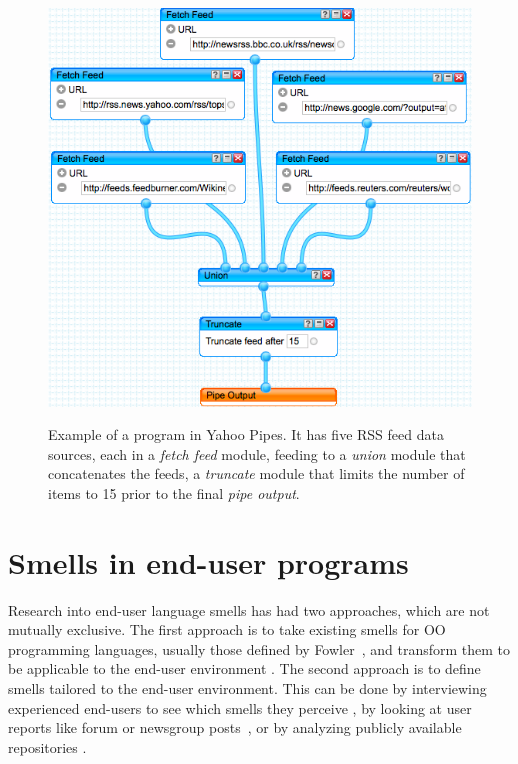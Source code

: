 \documentclass{sig-alternate}
\begin{document}
\begin{figure}
\caption{Example of a program in Yahoo Pipes. It has five RSS feed data sources, each in a \emph{fetch feed} module, feeding to a \emph{union} module that concatenates the feeds, a \emph{truncate} module that limits the number of items to 15 prior to the final \emph{pipe output}. }
\centering
\includegraphics[width=\columnwidth]{img/yp-1}
\label{fig:ypexample}
\end{figure}


\section{Smells in end-user programs}
\label{sec:smells}
Research into end-user language smells has had two approaches, which are not mutually exclusive.
The first approach is to take existing smells for OO programming languages, usually those defined by Fowler~\cite{Fowl1999}, and transform them to be applicable to the end-user environment \cite{Hermans2012inter,Hermans2012intra,Stolee2011,StoleeTSE2013, chambers2013smell}.
The second approach is to define smells tailored to the end-user environment.
This can be done by interviewing experienced end-users to see which smells they perceive \cite{chambers2013smell}, by looking at user reports like forum or newsgroup posts~\cite{badame2012refactoring,chambers2013smell}, or by analyzing publicly available repositories \cite{Stolee2011,StoleeTSE2013,Hermans2012intra}.
\end{document}
